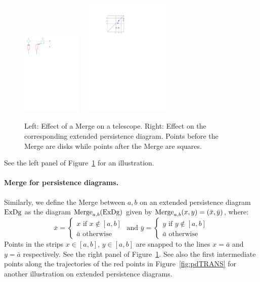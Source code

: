 \begin{figure}[h!]\begin{center}
\includegraphics[height=4cm]{figures/MergeSpace}\ \ \ \includegraphics[width = 4cm]{figures/MergePD}
\caption[Merge]{\label{fig:mergespace} Left: Effect of a Merge on a telescope. %
Right: Effect on the corresponding extended persistence diagram. 
Points before the Merge are disks while points after the Merge are squares.}
\end{center}\end{figure}
%
See the left panel of Figure~\ref{fig:mergespace} for an illustration.
%
\paragraph*{Merge for persistence diagrams.} 
Similarly, we define the Merge between $a,b$ on an extended persistence diagram~$\mathrm{ExDg}$ as the diagram $\mathrm{Merge}_{a,b}(\mathrm{ExDg})$ given by
$\mathrm{Merge}_{a,b}(x,y)=({\bar x},{\bar y})$, where:
%
\[
{\bar x}=\left\{ \begin{array}{ll} x\text{ if }x\notin[a,b] \\ {\bar a}\text{ otherwise } \end{array} \right.
\text{ and }
{\bar y}=\left\{ \begin{array}{ll} y\text{ if }y\notin[a,b] \\ {\bar a}\text{ otherwise } \end{array} \right.
\]
%
Points in the strips $x\in[a,b]$, $y\in[a,b]$ are snapped to the lines
$x=\bar{a}$ and $y=\bar{a}$ respectively.  See the right panel of
Figure~\ref{fig:mergespace}.  See also the first intermediate points
along the trajectories of the red points in
Figure~\ref{fig:pdTRANS} for another illustration on extended
persistence diagrams.  

